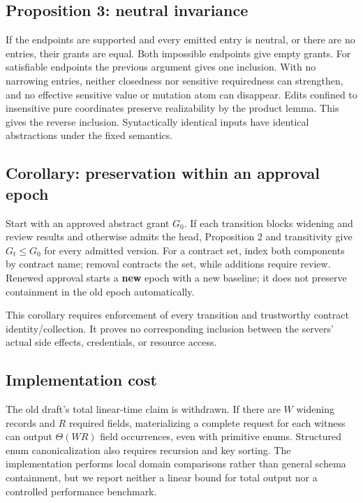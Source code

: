 \subsection{Proposition 3: neutral invariance}\label{proposition-3-neutral-invariance}

If the endpoints are supported and every emitted entry is neutral, or there are no entries, their grants are equal. Both impossible endpoints give empty grants. For satisfiable endpoints the previous argument gives one inclusion. With no narrowing entries, neither closedness nor sensitive requiredness can strengthen, and no effective sensitive value or mutation atom can disappear. Edits confined to insensitive pure coordinates preserve realizability by the product lemma. This gives the reverse inclusion. Syntactically identical inputs have identical abstractions under the fixed semantics.

\subsection{Corollary: preservation within an approval epoch}\label{corollary-preservation-within-an-approval-epoch}

Start with an approved abstract grant \(G_0\). If each transition blocks widening and review results and otherwise admits the head, Proposition 2 and transitivity give \(G_t\leq G_0\) for every admitted version. For a contract set, index both components by contract name; removal contracts the set, while additions require review. Renewed approval starts a \textbf{new} epoch with a new baseline; it does not preserve containment in the old epoch automatically.

This corollary requires enforcement of every transition and trustworthy contract identity/collection. It proves no corresponding inclusion between the servers' actual side effects, credentials, or resource access.

\subsection{Implementation cost}\label{implementation-cost}

The old draft's total linear-time claim is withdrawn. If there are \(W\) widening records and \(R\) required fields, materializing a complete request for each witness can output \(\Theta(WR)\) field occurrences, even with primitive enums. Structured enum canonicalization also requires recursion and key sorting. The implementation performs local domain comparisons rather than general schema containment, but we report neither a linear bound for total output nor a controlled performance benchmark.

